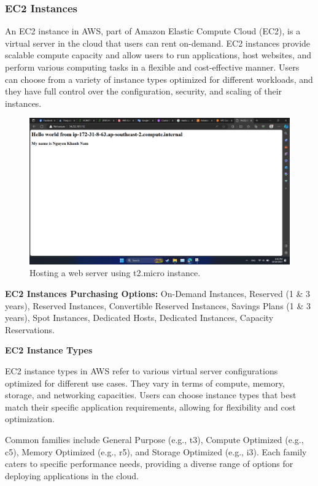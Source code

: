 \documentclass{article}
\begin{document}
\subsubsection{EC2 Instances}
An EC2 instance in AWS, part of Amazon Elastic Compute Cloud (EC2), is a virtual server in the cloud that users can rent on-demand. EC2 instances provide scalable compute capacity and allow users to run applications, host websites, and perform various computing tasks in a flexible and cost-effective manner. Users can choose from a variety of instance types optimized for different workloads, and they have full control over the configuration, security, and scaling of their instances.\par
\begin{figure}[h]
    \centering
    \includegraphics[width=13cm]{Pictures/Theory/EC2 web.png}
    \caption{Hosting a web server using t2.micro instance.}
    \label{fig:enter-label}
\end{figure}
\textbf{EC2 Instances Purchasing Options: }On-Demand Instances, Reserved (1 \& 3 years), Reserved Instances, Convertible Reserved Instances, Savings Plans (1 \& 3 years), Spot Instances, Dedicated Hosts, Dedicated Instances, Capacity Reservations.\par
\newpage
\textbf{EC2 Instance Types}\par
\vspace{10pt}
EC2 instance types in AWS refer to various virtual server configurations optimized for different use cases. They vary in terms of compute, memory, storage, and networking capacities. Users can choose instance types that best match their specific application requirements, allowing for flexibility and cost optimization.\par
Common families include General Purpose (e.g., t3), Compute Optimized (e.g., c5), Memory Optimized (e.g., r5), and Storage Optimized (e.g., i3). Each family caters to specific performance needs, providing a diverse range of options for deploying applications in the cloud.\par
\end{document}
